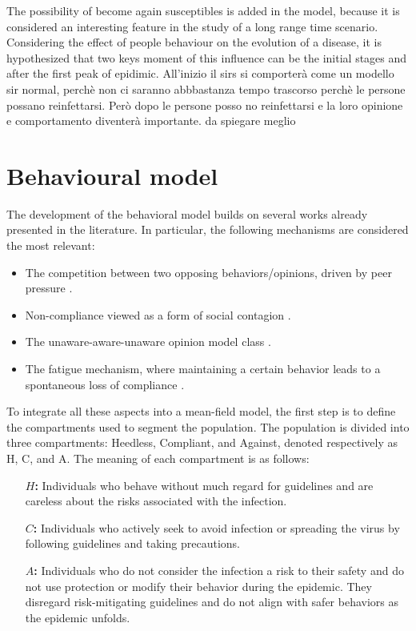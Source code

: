 The possibility of become again susceptibles is added in the model, because it is considered an interesting feature in the study of a long range time scenario. 
Considering the effect of people behaviour on the evolution of a disease, it is hypothesized that two keys moment of this influence can be the initial stages and after the first peak of epidimic. 
All'inizio il sirs si comporterà come un modello sir normal, perchè non ci saranno abbbastanza tempo trascorso perchè le persone possano reinfettarsi. Però dopo le persone posso no reinfettarsi e la loro opinione e comportamento diventerà importante. da spiegare meglio

\section{Behavioural model}
\label{sec:behavioral_model}

The development of the behavioral model builds on several works already presented in the literature. In particular, the following mechanisms are considered the most relevant:
\begin{itemize}
	\item The competition between two opposing behaviors/opinions, driven by peer pressure \cite{Epstein_2021}.
	\item Non-compliance viewed as a form of social contagion \cite{Bongarti2023}.
	\item The unaware-aware-unaware opinion model class \cite{Zuo2022, Peng2021}.
	\item The fatigue mechanism, where maintaining a certain behavior leads to a spontaneous loss of compliance \cite{Epstein_2021}.
\end{itemize}

To integrate all these aspects into a mean-field model, the first step is to define the compartments used to segment the population. The population is divided into three compartments: Heedless, Compliant, and Against, denoted respectively as H, C, and A. The meaning of each compartment is as follows:
\begin{itemize}
	\item[\textbf{$H$:}] Individuals who behave without much regard for guidelines and are careless about the risks associated with the infection.
	\item[\textbf{$C$:}] Individuals who actively seek to avoid infection or spreading the virus by following guidelines and taking precautions.
	\item[\textbf{$A$:}]Individuals who do not consider the infection a risk to their safety and do not use protection or modify their behavior during the epidemic. They disregard risk-mitigating guidelines and do not align with safer behaviors as the epidemic unfolds.
\end{itemize}


